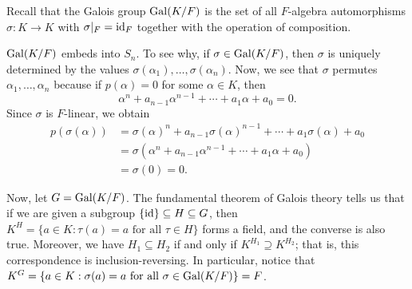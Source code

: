 Recall that the Galois group $\operatorname{Gal}(K/F)$ is the set of all $F$-algebra 
automorphisms $\sigma : K \to K$ with $\sigma|_F = \operatorname{id}_F$ together with the 
operation of composition. 

\begin{remark}{}
    $\operatorname{Gal}(K/F)$ embeds into $S_n$. To see why, if $\sigma \in \operatorname{Gal}(K/F)$, then 
    $\sigma$ is uniquely determined by the values $\sigma(\alpha_1), \dots, 
    \sigma(\alpha_n)$. Now, we see that $\sigma$ permutes $\alpha_1, \dots, 
    \alpha_n$ because if $p(\alpha) = 0$ for some $\alpha \in K$, then 
    \[ \alpha^n + a_{n-1} \alpha^{n-1} + \cdots + a_1 \alpha + a_0 = 0. \] 
    Since $\sigma$ is $F$-linear, we obtain 
    \begin{align*}
        p(\sigma(\alpha)) 
        &= \sigma(\alpha)^n + a_{n-1} \sigma(\alpha)^{n-1} + \cdots + a_1 \sigma(\alpha) + a_0 \\
        &= \sigma(\alpha^n + a_{n-1} \alpha^{n-1} + \cdots + a_1 \alpha + a_0) \\
        &= \sigma(0) = 0. 
    \end{align*}
\end{remark}

Now, let $G = \operatorname{Gal}(K/F)$. The fundamental theorem of Galois theory tells us that 
if we are given a subgroup $\{\operatorname{id}\} \subseteq H \subseteq G$, then 
$K^H = \{a \in K : \tau(a) = a \text{ for all } \tau \in H\}$ forms a field, 
and the converse is also true. Moreover, we have $H_1 \subseteq H_2$ if and only if 
$K^{H_1} \supseteq K^{H_2}$; that is, this correspondence is inclusion-reversing. 
In particular, notice that $K^G = \{a \in K : \sigma(a) = a \text{ for all } 
\sigma \in \operatorname{Gal}(K/F)\} = F$. 

